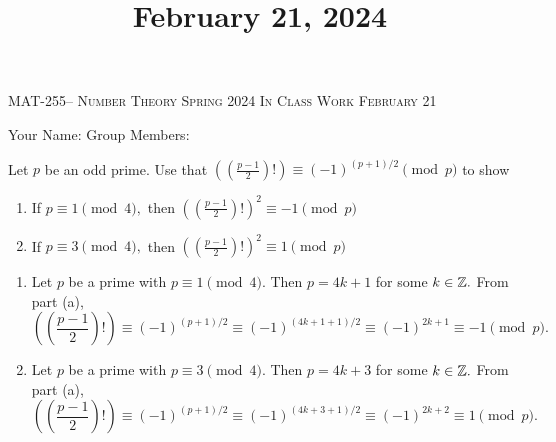 \documentclass[handout]{ximera}
\title{February 21, 2024}
\begin{document}
\handoutAbstract
\maketitle
  \begin{center}%
    {\large \scshape MAT-255-- Number Theory \hfill Spring 2024 \hfill In Class Work February 21}%
    
    {\large
        Your Name: \hrulefill \quad Group Members:\hrulefill \quad \hrulefill
	\par}%
  \end{center}%


  \begin{br}
    Let $p$ be an odd prime. Use that $\left(\left(\frac{p-1}{2}\right)!\right)\equiv (-1)^{(p+1)/2} \pmod{p}$ to show
    \begin{enumerate}
        
        \item If $p\equiv 1\pmod{4},$ then $\left(\left(\frac{p-1}{2}\right)!\right)^2\equiv -1 \pmod{p}$
        
        \item If $p\equiv 3\pmod{4},$ then $\left(\left(\frac{p-1}{2}\right)!\right)^2\equiv 1 \pmod{p}$
    \end{enumerate}

    \begin{solution}

        \begin{enumerate}
            
            \item Let $p$ be a prime with $p\equiv 1 \pmod 4.$ Then $p=4k+1$ for some $k\in\mathbb Z.$ From part (a), 
            \[\left(\left(\frac{p-1}{2}\right)!\right)\equiv (-1)^{(p+1)/2} \equiv (-1)^{(4k+1+1)/2}\equiv (-1)^{2k+1}\equiv -1 \pmod{p}.\]

            \item Let $p$ be a prime with $p\equiv 3 \pmod 4.$ Then $p=4k+3$ for some $k\in\mathbb Z.$ From part (a), 
            \[\left(\left(\frac{p-1}{2}\right)!\right)\equiv (-1)^{(p+1)/2} \equiv (-1)^{(4k+3+1)/2}\equiv (-1)^{2k+2}\equiv 1 \pmod{p}.\]
            
        \end{enumerate}
        
    \end{solution}
\end{br}


  
\end{document}
